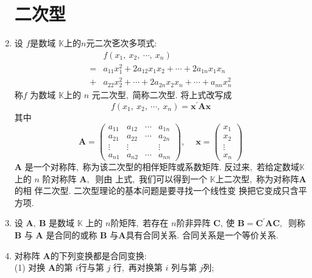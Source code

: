 \begin{enumerate}
		\section{二次型}
		\item 设 $ f  $是数域  $\mathbb{K}  $上的$  n  $元二次㐎次多项式:
		$$\begin{aligned}
			& f\left(x_{1},\  x_{2},\  \cdots,\  x_{n}\right) \\
			=& a_{11} x_{1}^{2}+2 a_{12} x_{1} x_{2}+\cdots+2 a_{1 n} x_{1} x_{n} \\
			+& a_{22} x_{2}^{2}+\cdots+2 a_{2 n} x_{2} x_{n}+\cdots+a_{n n} x_{n}^{2}
		\end{aligned}$$
		称$  f$  为数域 $ \mathbb{K}  $上的  $n$  元二次型,\  简称二次型. 将上式改写成
		$$f\left(x_{1},\  x_{2},\  \cdots,\  x_{n}\right)=\boldsymbol{x}^{\prime} \boldsymbol{A} \boldsymbol{x}$$
		其中
		$$\boldsymbol{A}=\left(\begin{array}{cccc}
			a_{11} & a_{12} & \cdots & a_{1 n} \\
			a_{21} & a_{22} & \cdots & a_{2 n} \\
			\vdots & \vdots & & \vdots \\
			a_{n 1} & a_{n 2} & \cdots & a_{n n}
		\end{array}\right),\  \quad \boldsymbol{x}=\left(\begin{array}{c}
			x_{1} \\
			x_{2} \\
			\vdots \\
			x_{n}
		\end{array}\right)$$
		$\boldsymbol{A} $ 是一个对称阵,\  称为该二次型的相伴矩阵或系数矩阵. 反过来,\  若给定数域$  \mathbb{K} $ 上的  $n $ 阶对称阵  $\boldsymbol{A} ,\ $ 则由 上式,\  我们可以得到一个 $ \mathbb{K}  $上二次型,\  称为对称阵$  \boldsymbol{A}  $的相 伴二次型. 二次型理论的基本问题是要寻找一个线性变 换把它变成只含平方项.
		\item 设 $ \boldsymbol{A},\  \boldsymbol{B} $ 是数域  $\mathbb{K} $ 上的  $n  $阶矩阵,\  若存在 $ n  $阶非异阵  $\boldsymbol{C},\  $使 $ \boldsymbol{B}=\boldsymbol{C}^{\prime} \boldsymbol{A} \boldsymbol{C} ,\ $ 则称  $\boldsymbol{B}$  与  $\boldsymbol{A}$ 是合同的或称 $\boldsymbol{B}$  与$  \boldsymbol{A}  $具有合同关系. 合同关系是一个等价关系.
		\item 对称阵 $ \boldsymbol{A}  $的下列变换都是合同变换:\\
		(1) 对换 $ \boldsymbol{A}  $的第  $i  $行与第  $j $ 行,\  再对换第 $ i $ 列与第  $j  $列;\\

\end{enumerate}
